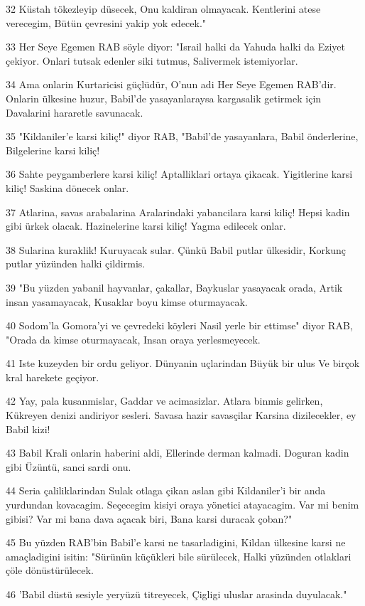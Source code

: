 \par 32 Küstah tökezleyip düsecek, Onu kaldiran olmayacak. Kentlerini atese verecegim, Bütün çevresini yakip yok edecek."
\par 33 Her Seye Egemen RAB söyle diyor: "Israil halki da Yahuda halki da Eziyet çekiyor. Onlari tutsak edenler siki tutmus, Salivermek istemiyorlar.
\par 34 Ama onlarin Kurtaricisi güçlüdür, O'nun adi Her Seye Egemen RAB'dir. Onlarin ülkesine huzur, Babil'de yasayanlaraysa kargasalik getirmek için Davalarini hararetle savunacak.
\par 35 "Kildaniler'e karsi kiliç!" diyor RAB, "Babil'de yasayanlara, Babil önderlerine, Bilgelerine karsi kiliç!
\par 36 Sahte peygamberlere karsi kiliç! Aptalliklari ortaya çikacak. Yigitlerine karsi kiliç! Saskina dönecek onlar.
\par 37 Atlarina, savas arabalarina Aralarindaki yabancilara karsi kiliç! Hepsi kadin gibi ürkek olacak. Hazinelerine karsi kiliç! Yagma edilecek onlar.
\par 38 Sularina kuraklik! Kuruyacak sular. Çünkü Babil putlar ülkesidir, Korkunç putlar yüzünden halki çildirmis.
\par 39 "Bu yüzden yabanil hayvanlar, çakallar, Baykuslar yasayacak orada, Artik insan yasamayacak, Kusaklar boyu kimse oturmayacak.
\par 40 Sodom'la Gomora'yi ve çevredeki köyleri Nasil yerle bir ettimse" diyor RAB, "Orada da kimse oturmayacak, Insan oraya yerlesmeyecek.
\par 41 Iste kuzeyden bir ordu geliyor. Dünyanin uçlarindan Büyük bir ulus Ve birçok kral harekete geçiyor.
\par 42 Yay, pala kusanmislar, Gaddar ve acimasizlar. Atlara binmis gelirken, Kükreyen denizi andiriyor sesleri. Savasa hazir savasçilar Karsina dizilecekler, ey Babil kizi!
\par 43 Babil Krali onlarin haberini aldi, Ellerinde derman kalmadi. Doguran kadin gibi Üzüntü, sanci sardi onu.
\par 44 Seria çaliliklarindan Sulak otlaga çikan aslan gibi Kildaniler'i bir anda yurdundan kovacagim. Seçecegim kisiyi oraya yönetici atayacagim. Var mi benim gibisi? Var mi bana dava açacak biri, Bana karsi duracak çoban?"
\par 45 Bu yüzden RAB'bin Babil'e karsi ne tasarladigini, Kildan ülkesine karsi ne amaçladigini isitin: "Sürünün küçükleri bile sürülecek, Halki yüzünden otlaklari çöle dönüstürülecek.
\par 46 'Babil düstü sesiyle yeryüzü titreyecek, Çigligi uluslar arasinda duyulacak."

